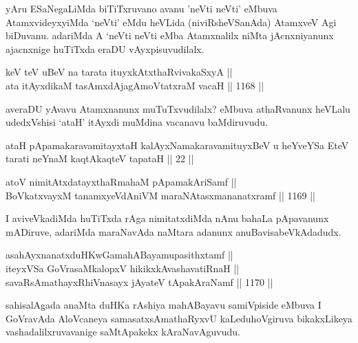 \begin{artha}
yAru ESaNegaLiMda biTiTxruvano avanu 'neVti neVti' eMbuva AtamxvideyxyiMda `neVti' eMdu heVLida (niviRsheVSanAda) AtamxveV Agi biDuvanu. adariMda A `neVti neVti eMba Atamxnalilx niMta jAcnxniyanunx ajacnxnige huTiTxda eraDU vAyxpisuvudilalx.
\end{artha}

\begin{shl}
keV teV uBeV na tarata ituyxkAtxthaRvivakaSxyA ||  \\
ata itAyxdikaM tasAmxdAjagAmoVtatxraM vacaH \hfill || 1168 ||  
\end{shl}

\begin{artha}
averaDU yAvavu Atamxnanunx muTuTxvudilalx? eMbuva athaRvanunx heVLalu udedxVshisi `ataH' itAyxdi muMdina vacanavu baMdiruvudu.
\end{artha}


\begin{shl}
ataH pApamakaravamitayxtaH kalAyxNamakaravamituyxBeV u heYveYSa EteV tarati neYnaM kaqtAkaqteV tapataH || 22 ||
\end{shl}


\begin{shl}
atoV nimitAtxdatayxthaRmahaM pApamakAriSamf || \\
BoVkatxvayxM tanamxyeVdAniVM maraNAtasxmananatxramf \hfill || 1169 ||  
\end{shl}

\begin{artha}
I aviveVkadiMda huTiTxda rAga nimitatxdiMda nAnu bahaLa pApavanunx mADiruve, adariMda maraNavAda naMtara adanunx  anuBavisabeVkAdadudx.
\end{artha}

\begin{shl}
asahAyxnanatxduHKwGamahABayamupasithxtamf || \\
iteyxVSa GoVrasaMkalopxV hikikxkAvashavatiRnaH || \\
savaRsAmathayxRhiVnasayx jAyateV tApakAraNamf \hfill || 1170 ||  
\end{shl}

\begin{artha}
sahisalAgada anaMta duHKa rAshiya mahABayavu samiVpiside eMbuva I GoVravAda  AloVcaneya samasatxsAmathaRyxvU kaLeduhoVgiruva bikakxLikeya vashadalilxruvavanige saMtApakekx kAraNavAguvudu.
\end{artha}


